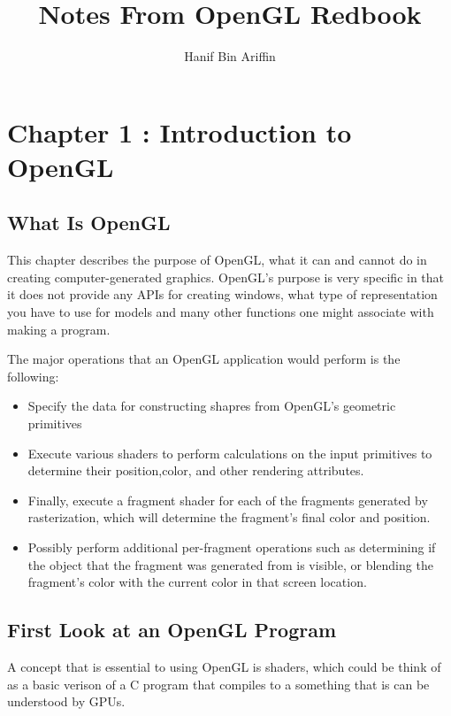 \documentclass[a4paper, 12pt]{article}
\title{Notes From OpenGL Redbook}
\author{Hanif Bin Ariffin}
\begin{document}
\maketitle
\tableofcontents

\newpage
\section{Chapter 1 : Introduction to OpenGL}

\subsection{What Is OpenGL}

This chapter describes the purpose of OpenGL, what it can and cannot do in creating computer-generated graphics.
OpenGL's purpose is very specific in that it does not provide any APIs for creating windows, what type of representation you have to use for models and many other functions one might associate with making a program.

The major operations that an OpenGL application would perform is the following:

\begin{itemize}
      \item Specify the data for constructing shapres from OpenGL's geometric primitives
      \item Execute various shaders to perform calculations on the input primitives to determine their position,color, and other rendering attributes.
      \item Finally, execute a fragment shader for each of the fragments generated by rasterization, which will determine the fragment's final color and position.
      \item Possibly perform additional per-fragment operations such as determining if the object that the fragment was generated from is visible, or blending the fragment's color with the current color in that screen location.
\end{itemize}

\subsection{First Look at an OpenGL Program}

A concept that is essential to using OpenGL is shaders, which could be think of as a basic verison of a C program that compiles to a something that is can be understood by GPUs.
\end{document}
